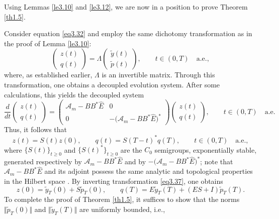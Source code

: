 \documentclass[10pt, a4]{amsart}
\makeatletter
\theoremstyle{plain}
\theoremstyle{definition}
\theoremstyle{remark}
\renewenvironment{proof}[1][\proofname]{\par
  \pushQED{\qed}%
  \normalfont \topsep6\p@\@plus6\p@\relax
  \trivlist
  \item[\hskip\labelsep
        \itshape
    #1\ \ref{#1}.]\ignorespaces
}{%
  \popQED\endtrivlist\@endpefalse
}
\numberwithin{equation}{section}
\makeatother
\begin{document}
Using Lemmas \ref{le3.10} and \ref{le3.12}, we are now in a position to prove Theorem \ref{th1.5}.
\begin{proof}[of Theorem \ref{th1.5}]
Consider equation \eqref{eq3.32} and employ the same dichotomy transformation as in the proof of Lemma \ref{le3.10}:
\begin{equation}\label{eq3.37}
\begin{pmatrix}
z(t) \\[1mm]
q(t)
\end{pmatrix}
=\Lambda \begin{pmatrix}
\tilde{y}(t) \\[1mm]
\tilde{p}(t)
\end{pmatrix},\qquad t\in (0,T)\quad \text{a.e.},
\end{equation}
where, as established earlier, \(\Lambda\) is an invertible matrix. Through this transformation, one obtains a decoupled evolution system. After some calculations, this yields the decoupled system
\begin{equation}\label{eq3.38}
\frac{d}{dt}\begin{pmatrix}
z(t) \\[1mm]
q(t)
\end{pmatrix}
=\begin{pmatrix}
\mathcal{A}_m-BB^*\hat{E} & 0\\[1mm]
0 & -\bigl(\mathcal{A}_m-BB^*\hat{E}\bigr)^*
\end{pmatrix}\begin{pmatrix}
z(t) \\[1mm]
q(t)
\end{pmatrix},\qquad t\in (0,T)\quad \text{a.e.}
\end{equation}
Thus, it follows that
\begin{equation}\label{eq3.39}
z(t)=S(t)z(0),\qquad q(t)=S(T-t)^*q(T),\qquad t\in (0,T)\quad \text{a.e.},
\end{equation}
where \(\{S(t)\}_{t\ge0}\) and \(\{S(t)^*\}_{t\ge0}\) are the \(C_0\) semigroups, exponentially stable, generated respectively by \(\mathcal{A}_m-BB^*\hat{E}\) and by \(-\bigl(\mathcal{A}_m-BB^*\hat{E}\bigr)^*\); note that \(\mathcal{A}_m-BB^*\hat{E}\) and its adjoint possess the same analytic and topological properties in the Hilbert space \cite{ref58}. By inverting transformation \eqref{eq3.37}, one obtains
\[
z(0)=\tilde{y}_T(0)+S\tilde{p}_T(0),\qquad q(T)=E\tilde{y}_T(T)+(ES+I)\tilde{p}_T(T).
\]
To complete the proof of Theorem \ref{th1.5}, it suffices to show that the norms \(\Vert\tilde{p}_T(0)\Vert\) and \(\Vert\tilde{y}_T(T)\Vert\) are uniformly bounded, i.e.,

\end{proof}
\end{document}
